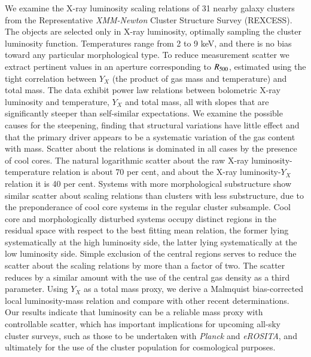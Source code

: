 \documentclass[oldversion]{aa}
\newcommand{\rexcess}{{\gwpfont REXCESS}}
\begin{document}
  \date{Received 22 Sept 2008; accepted 20 Feb 2009}
  \abstract 
   {We examine the X-ray luminosity scaling relations of 31 nearby galaxy clusters from the Representative {\it
       XMM-Newton\/} 
     Cluster Structure Survey (\rexcess). The objects are selected only in X-ray
     luminosity, optimally sampling the cluster luminosity
     function. Temperatures range from 2 to 9 keV, and there is no bias toward any particular morphological type. To reduce measurement
     scatter we extract pertinent values in
     an aperture corresponding to $R_{500}$, estimated using the tight correlation between $Y_X$ (the product of gas mass and temperature) and total mass. The data exhibit power law
     relations between bolometric X-ray luminosity and temperature, $Y_X$ and total mass, all with slopes that are significantly steeper than self-similar
     expectations. We examine the possible causes for the steepening, finding that structural variations have little effect and that the primary driver appears to be a systematic variation of the gas content with mass.
     Scatter about the relations is dominated in all cases by
     the presence of cool cores. The natural logarithmic scatter about the raw X-ray luminosity-temperature relation is about 70 per cent, and about the X-ray luminosity-$Y_X$ relation it is 40 per cent. Systems with more morphological substructure show similar scatter about scaling relations than clusters with less substructure, due to the preponderance of cool core systems in the regular cluster subsample. Cool core and morphologically disturbed systems occupy distinct regions in the residual space with respect to the best fitting mean relation, the former lying systematically at the high luminosity side, the latter lying systematically at the low luminosity side. Simple exclusion of the central regions serves to reduce the scatter about the scaling relations by more than a factor of two. The scatter reduces by a similar amount
with the use of the central gas density as a third parameter. Using $Y_X$ as a total mass proxy, we derive a Malmquist bias-corrected local luminosity-mass relation and compare with other recent determinations. Our results indicate that luminosity can be a reliable mass proxy with controllable scatter, which has important implications for upcoming all-sky cluster surveys, such as those to be undertaken with {\it Planck} and {\it eROSITA}, and ultimately for the use of the cluster population for cosmological purposes. }    
\end{document}
